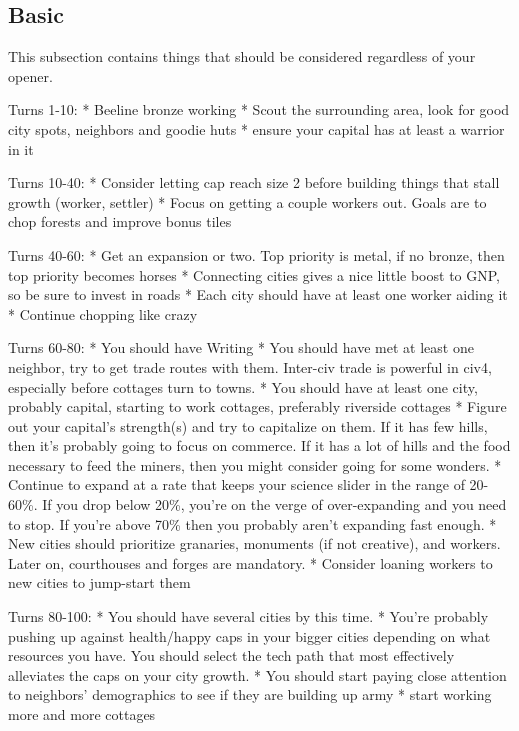 \documentclass[10pt]{article}
\begin{document}
\subsection*{Basic}

This subsection contains things that should be considered regardless of your opener.

Turns 1-10:
* Beeline bronze working
* Scout the surrounding area, look for good city spots, neighbors and goodie huts
* ensure your capital has at least a warrior in it

Turns 10-40:
* Consider letting cap reach size 2 before building things that stall growth (worker, settler)
* Focus on getting a couple workers out. Goals are to chop forests and improve bonus tiles

Turns 40-60:
* Get an expansion or two. Top priority is metal, if no bronze, then top priority becomes horses
* Connecting cities gives a nice little boost to GNP, so be sure to invest in roads
* Each city should have at least one worker aiding it
* Continue chopping like crazy

Turns 60-80:
* You should have Writing
* You should have met at least one neighbor, try to get trade routes with them. Inter-civ trade is powerful in civ4, especially
  before cottages turn to towns.
* You should have at least one city, probably capital, starting to work cottages, preferably riverside cottages
* Figure out your capital's strength(s) and try to capitalize on them. If it has few hills, then it's probably
  going to focus on commerce. If it has a lot of hills and the food necessary to feed the miners, then you might
  consider going for some wonders.
* Continue to expand at a rate that keeps your science slider in the range of 20-60\%. If you drop below 20\%,
  you're on the verge of over-expanding and you need to stop. If you're above 70\% then you probably aren't
  expanding fast enough.
* New cities should prioritize granaries, monuments (if not creative), and workers. Later on, courthouses and forges are mandatory.
* Consider loaning workers to new cities to jump-start them

Turns 80-100:
* You should have several cities by this time.
* You're probably pushing up against health/happy caps in your bigger cities depending on what
  resources you have. You should select the tech path that most effectively alleviates the caps
  on your city growth.
* You should start paying close attention to neighbors' demographics to see if they are building up army
* start working more and more cottages
\end{document}
